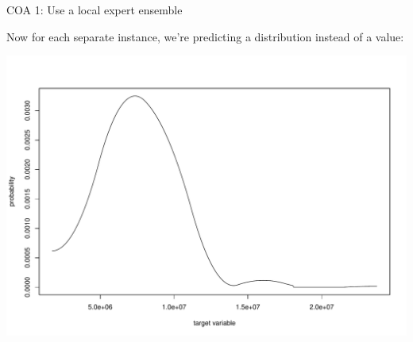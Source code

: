 \documentclass[ignorenonframetext,]{beamer}
\newenvironment{Shaded}{\begin{snugshade}}{\end{snugshade}}
\newcommand{\KeywordTok}[1]{\textcolor[rgb]{0.13,0.29,0.53}{\textbf{{#1}}}}
\newcommand{\DataTypeTok}[1]{\textcolor[rgb]{0.13,0.29,0.53}{{#1}}}
\newcommand{\DecValTok}[1]{\textcolor[rgb]{0.00,0.00,0.81}{{#1}}}
\newcommand{\OtherTok}[1]{\textcolor[rgb]{0.56,0.35,0.01}{{#1}}}
\newcommand{\NormalTok}[1]{{#1}}
\begin{document}
\begin{frame}[fragile]{COA 1: Use a local expert ensemble}

Now for each separate instance, we're predicting a distribution instead
of a value:

\footnotesize

\begin{Shaded}
\end{Shaded}

\includegraphics{presentation_files/figure-beamer/unnamed-chunk-15-1.pdf}


\end{frame}
\end{document}

